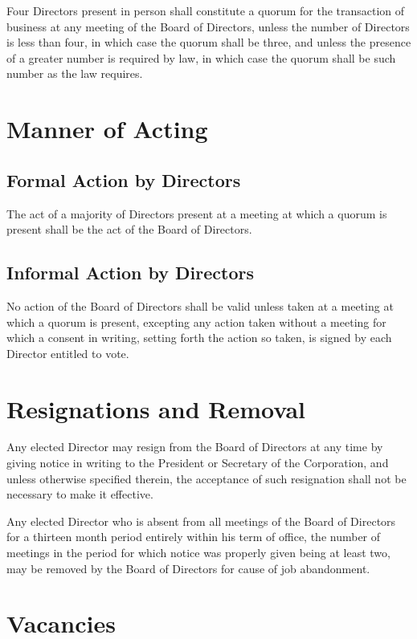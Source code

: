 Four Directors present in person shall constitute a quorum for the transaction
of business at any meeting of the Board of Directors, unless the number of
Directors is less than four, in which case the quorum shall be three, and unless
the presence of a greater number is required by law, in which case the quorum
shall be such number as the law requires.

\section{Manner of Acting}

\subsection{Formal Action by Directors}

The act of a majority of Directors present at a meeting at which a quorum is
present shall be the act of the Board of Directors.

\subsection{Informal Action by Directors}

No action of the Board of Directors shall be valid unless taken at a meeting at
which a quorum is present, excepting any action taken without a meeting for
which a consent in writing, setting forth the action so taken, is signed by each
Director entitled to vote.

\section{Resignations and Removal}

Any elected Director may resign from the Board of Directors at any time by
giving notice in writing to the President or Secretary of the Corporation, and
unless otherwise specified therein, the acceptance of such resignation shall not
be necessary to make it effective.

Any elected Director who is absent from all meetings of the Board of Directors
for a thirteen month period entirely within his term of office, the number of
meetings in the period for which notice was properly given being at least two,
may be removed by the Board of Directors for cause of job abandonment.

\section{Vacancies}

